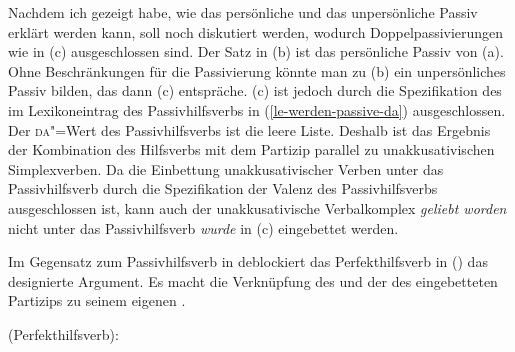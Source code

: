 Nachdem ich gezeigt habe, wie das persönliche und das unpersönliche Passiv erklärt werden
kann, soll noch diskutiert werden, wodurch Doppelpassivierungen wie in (c) ausgeschlossen sind.
\eal
\label{ex-double-application-of-passive}
\zl
Der Satz in (b) ist das persönliche Passiv von (a). Ohne Beschränkungen
für die Passivierung könnte man zu (b) ein unpersönliches Passiv bilden, das dann (c)
entspräche. (c) ist jedoch durch die Spezifikation des \dawes im Lexikoneintrag
des Passivhilfsverbs in (\ref{le-werden-passive-da}) ausgeschlossen. Der \textsc{da}"=Wert des Passivhilfsverbs
ist die leere Liste. Deshalb ist das Ergebnis der Kombination des Hilfsverbs mit dem Partizip parallel
zu unakkusativischen Simplexverben. Da die Einbettung unakkusativischer Verben unter das
Passivhilfsverb durch die Spezifikation der Valenz des Passivhilfsverbs ausgeschlossen ist,
kann auch der unakkusativische Verbalkomplex \emph{geliebt worden} nicht unter 
das Passivhilfsverb \emph{wurde} in (c) eingebettet werden.

Im Gegensatz zum Passivhilfsverb in 
deblockiert das Perfekthilfsverb in () das designierte Argument.
Es macht die Verknüpfung des \subjwes und der \compsl des eingebetteten Partizips
zu seinem eigenen \argstw.

\eas
\label{le-haben-perfekt}%
\mbox{\haben (Perfekthilfsverb):}\\
\zs

